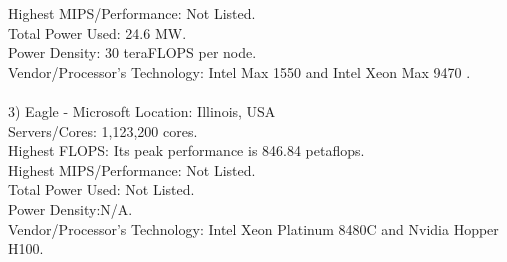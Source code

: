 \documentclass[11pt]{article}
\begin{document}
Highest MIPS/Performance: Not Listed.\\
Total Power Used:  	24.6 MW.\\
Power Density: 30 teraFLOPS per node.\\
Vendor/Processor's Technology: Intel Max 1550 and Intel Xeon Max 9470 .\\
\\
3) Eagle - Microsoft
Location: Illinois, USA \\
Servers/Cores: 1,123,200 cores.\\
Highest FLOPS: Its peak performance is 846.84  petaflops.\\
Highest MIPS/Performance: Not Listed.\\
Total Power Used:  	Not Listed.\\
Power Density:N/A.\\
Vendor/Processor's Technology: Intel Xeon Platinum 8480C and Nvidia Hopper H100.\\

	
	
\end{document}
